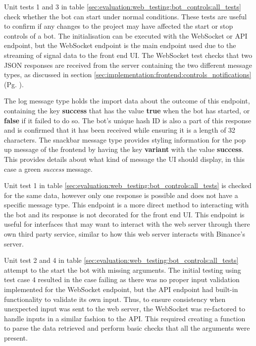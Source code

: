Unit tests 1 and 3 in table \ref{sec:evaluation:web_testing:bot_controls:all_tests} check whether the bot can start under normal conditions. These tests are useful to confirm if any changes to the project may have affected the start or stop controls of a bot. The initialisation can be executed with the WebSocket or API endpoint, but the WebSocket endpoint is the main endpoint used due to the streaming of signal data to the front end UI. The WebSocket test checks that two JSON responses are received from the server containing the two different message types, as discussed in section \ref{sec:implementation:frontend:controls_notifications} (Pg. \pageref{sec:implementation:frontend:controls_notifications}). 

The log message type holds the import data about the outcome of this endpoint, containing the key \textbf{success} that has the value \textbf{true} when the bot has started, or \textbf{false} if it failed to do so. The bot's unique hash ID is also a part of this response and is confirmed that it has been received while ensuring it is a length of 32 characters. The snackbar message type provides styling information for the pop up message of the frontend by having the key \textbf{variant} with the value \textbf{success}. This provides details about what kind of message the UI should display, in this case a green \textit{success} message.

Unit test 1 in table \ref{sec:evaluation:web_testing:bot_controls:all_tests} is checked for the same data, however only one response is possible and does not have a specific message type. This endpoint is a more direct method to interacting with the bot and its response is not decorated for the front end UI. This endpoint is useful for interfaces that may want to interact with the web server through there own third party service, similar to how this web server interacts with Binance's server. 

Unit test 2 and 4 in table \ref{sec:evaluation:web_testing:bot_controls:all_tests} attempt to the start the bot with missing arguments. The initial testing using test case 4 resulted in the case failing as there was no proper input validation implemented for the WebSocket endpoint, but the API endpoint had built-in functionality to validate its own input. Thus, to ensure consistency when unexpected input was sent to the web server, the WebSocket was re-factored to handle inputs in a similar fashion to the API. This required creating a function to parse the data retrieved and perform basic checks that all the arguments were present. 

